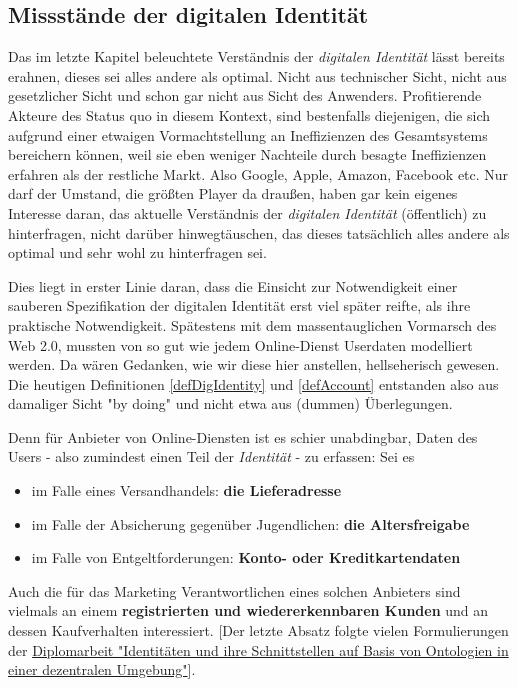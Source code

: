 
\subsection{Missstände der digitalen Identität}
\label{sec:einleitung_probleme_digitaler_identitaet}

\vspace{0.3cm}

Das im letzte Kapitel beleuchtete Verständnis der \textit{digitalen Identität} lässt bereits erahnen, dieses sei alles andere als optimal. Nicht aus technischer Sicht, nicht aus gesetzlicher Sicht und schon gar nicht aus Sicht des Anwenders. Profitierende Akteure des Status quo in diesem Kontext, sind bestenfalls diejenigen, die sich aufgrund einer etwaigen Vormachtstellung an Ineffizienzen des Gesamtsystems bereichern können, weil sie eben weniger Nachteile durch besagte Ineffizienzen erfahren als der restliche Markt. Also Google, Apple, Amazon, Facebook etc. Nur darf der Umstand, die größten Player da draußen, haben gar kein eigenes Interesse daran, das aktuelle Verständnis der \textit{digitalen Identität} (öffentlich) zu hinterfragen, nicht darüber hinwegtäuschen, das dieses tatsächlich alles andere als optimal und sehr wohl zu hinterfragen sei.

Dies liegt in erster Linie daran, dass die Einsicht zur Notwendigkeit einer sauberen Spezifikation der digitalen Identität erst viel später reifte, als ihre praktische Notwendigkeit. Spätestens mit dem massentauglichen Vormarsch des Web 2.0, mussten von so gut wie jedem Online-Dienst Userdaten modelliert werden. Da wären Gedanken, wie wir diese hier anstellen, hellseherisch gewesen. Die heutigen Definitionen \ref{defDigIdentity} und \ref{defAccount} entstanden also aus damaliger Sicht "by doing" und nicht etwa aus (dummen) Überlegungen.

\vspace{0.1cm}

Denn für Anbieter von Online-Diensten ist es schier unabdingbar, Daten des Users - also zumindest einen Teil der \textit{Identität} - zu erfassen: Sei es 

\begin{itemize}
  \item im Falle eines Versandhandels: \textbf{die Lieferadresse}
  \item im Falle der Absicherung gegenüber Jugendlichen: \textbf{die Altersfreigabe}
  \item im Falle von Entgeltforderungen: \textbf{Konto- oder Kreditkartendaten}
\end{itemize}
Auch die für das Marketing Verantwortlichen eines solchen Anbieters sind vielmals an einem \textbf{registrierten und wiedererkennbaren Kunden} und an dessen Kaufverhalten interessiert. [Der letzte Absatz folgte vielen Formulierungen der \href{https://vsis-www.informatik.uni-hamburg.de/getDoc.php/thesis/47/DA_Gordian_Kaulbarsch.pdf}{Diplomarbeit "Identitäten und ihre Schnittstellen auf Basis von Ontologien in einer dezentralen Umgebung"}]. 

